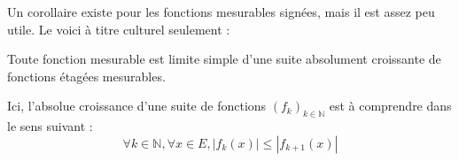 \documentclass[../integ-proba.tex]{subfiles}
\begin{document}
  Un corollaire existe pour les fonctions mesurables signées, mais il est assez peu utile.
  Le voici à titre culturel seulement :

  \begin{cor}
    Toute fonction mesurable est limite simple d'une suite absolument croissante de fonctions étagées mesurables.
  \end{cor}

  \begin{rem}
    Ici, l'absolue croissance d'une suite de fonctions $\left(f_k\right)_{k\in \mathbb{N}}$ est à comprendre dans le sens suivant :
    \begin{displaymath}
      \forall k \in \mathbb{N}, \forall x \in E, \left|f_k(x)\right| \leq \left|f_{k+1}(x)\right|
    \end{displaymath}
  \end{rem}
\end{document}
